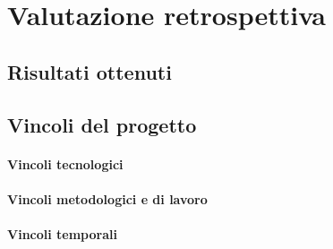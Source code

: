\documentclass[Tesi.tex]{subfiles}
\begin{document}
\chapter{Valutazione retrospettiva}

\section{Risultati ottenuti}

\section{Vincoli del progetto}
\subsubsection{Vincoli tecnologici}

\subsubsection{Vincoli metodologici e di lavoro}

\subsubsection{Vincoli temporali}
\end{document}
